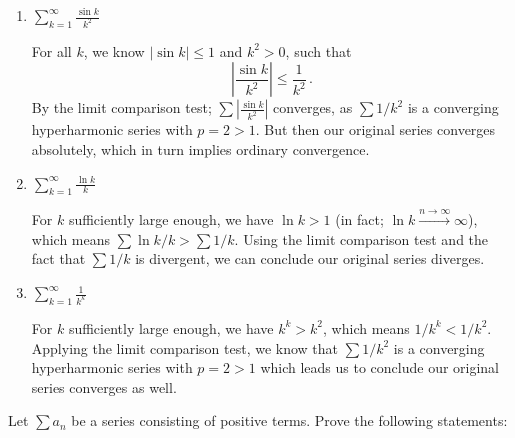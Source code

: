 \documentclass[week=6]{homework}
\begin{document}
\begin{questions}
\begin{enumerate}[label=(\alph*)]
        	\addtocounter{enumi}{3}
        	\item $\displaystyle \sum_{k=1}^{\infty} \frac{\sin k}{k^2}$
        	
        	For all $k$, we know $|\sin k| \leq 1$ and $k^2 > 0$, such that
        	\[
	        	\left| \frac{\sin k}{k^2} \right| \leq \frac{1}{k^2}\,.
        	\]
        	By the limit comparison test; $\sum |\frac{\sin k}{k^2}|$ converges, as $\sum 1/k^2$ is a converging hyperharmonic series with $p = 2 > 1$. But then our original series converges absolutely, which in turn implies ordinary convergence.
        	
        	\item $\displaystyle \sum_{k=1}^{\infty} \frac{\ln k}{k}$
        	
        	For $k$ sufficiently large enough, we have $\ln k > 1$ (in fact; $\ln k \xrightarrow{n\to\infty} \infty$), which means $\sum \ln k / k > \sum 1 / k$. Using the limit comparison test and the fact that $\sum 1/k$ is divergent, we can conclude our original series diverges.
        	
        	\addtocounter{enumi}{1}
        	\item $\displaystyle \sum_{k=1}^{\infty} \frac{1}{k^k}$
        	
        	For $k$ sufficiently large enough, we have $k^k > k^2$, which means $1/k^k < 1/k^2$. Applying the limit comparison test, we know that $\sum 1 / k^2$ is a converging hyperharmonic series with $p = 2 > 1$ which leads us to conclude our original series converges as well.
        \end{enumerate}
	    
	    \question
	    Let $\sum a_n$ be a series consisting of positive terms. Prove the following statements:
    

\end{questions}
\end{document}
